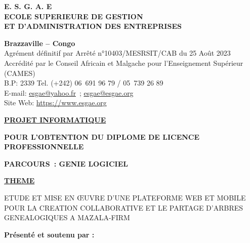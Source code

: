 \begin{titlepage}
  \begin{center}
    \vspace*{\fill}

    \large {
      \textbf{
        E. S. G. A. E \\
        ECOLE SUPERIEURE DE GESTION \\
        ET D’ADMINISTRATION DES ENTREPRISES \\
      }
    }

    \vspace{0.2cm}

    \large {
      \textbf{ Brazzaville – Congo } \\
      Agrément définitif par Arrêté n°10403/MESRSIT/CAB du 25 Août 2023 \\
      Accrédité par le Conseil Africain et Malgache pour l’Enseignement Supérieur (CAMES) \\
      B.P: 2339 Tel. (+242) 06 691 96 79 / 05 739 26 89 \\
      E-mail: \href{mailto:esgae@yahoo.fr}{esgae@yahoo.fr} ; \href{mailto:esgae@esgae.org}{esgae@esgae.org} \\
      Site Web: \url {https://www.esgae.org} \\
    }

    \vspace{1.5cm}

    \large {
      \textbf { \underline {PROJET INFORMATIQUE} }
    }

    \vspace{0.2cm}
    \large {
      \textbf{POUR L’OBTENTION DU DIPLOME DE LICENCE PROFESSIONNELLE}
    }

    \vspace{0.2cm}
    \large {
      \textbf{PARCOURS : GENIE LOGICIEL}
    }

    \vspace{1.5cm}

    \normalsize {
      \textbf { \underline {THEME} }
    }

    \vspace{0.2cm}
    \large {
      ETUDE ET MISE EN ŒUVRE D’UNE PLATEFORME WEB ET MOBILE POUR LA CREATION COLLABORATIVE ET LE PARTAGE D’ARBRES GENEALOGIQUES A MAZALA-FIRM
    }
  \end{center}

  \vspace{1.5cm}

  \noindent
  \begin{minipage}[t]{0.45\textwidth}
    \large{
      \textbf{
        Présenté et soutenu par : \\
      }
    }
    \normalsize{
      \projetauthor
    }


\end{minipage}
\end{titlepage}
